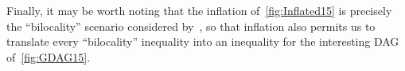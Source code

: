 Finally, it may be worth noting that the inflation of~\cref{fig:Inflated15} is precisely the ``bilocality'' scenario considered by~\citet{BilocalCorrelations}, so that inflation also permits us to translate every ``bilocality'' inequality into an inequality for the interesting DAG of~\cref{fig:GDAG15}.




